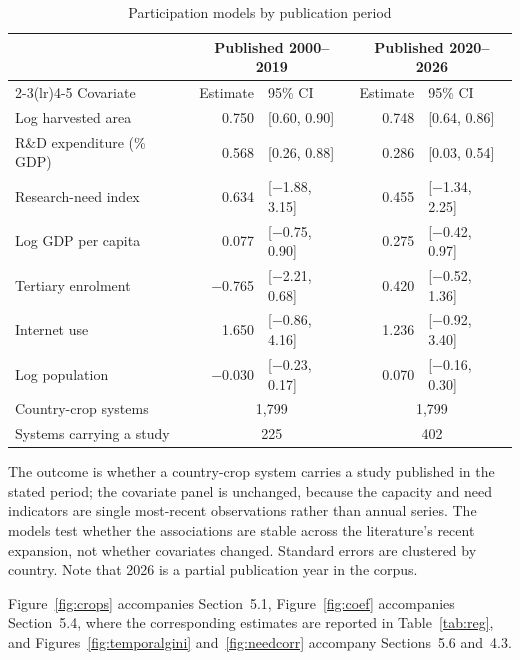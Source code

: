 \documentclass[ASNA,twocolumn]{USG}
\makeatletter
\newcommand{\applabel}[2]{\phantomsection\edef\@currentlabel{#1}\label{#2}}
\makeatother
\begin{document}
\begin{table}[t]
\centering
\footnotesize
\caption{Participation models by publication period}
\label{tab:periods}
\begin{tabular*}{\textwidth}{@{\extracolsep\fill}l r@{\hspace{6pt}}l r@{\hspace{6pt}}l@{}}
\toprule
& \multicolumn{2}{c}{Published 2000--2019} & \multicolumn{2}{c}{Published 2020--2026} \\
\cmidrule(lr){2-3}\cmidrule(lr){4-5}
Covariate & Estimate & 95\% CI & Estimate & 95\% CI \\
\midrule
Log harvested area & 0.750 & [0.60, 0.90] & 0.748 & [0.64, 0.86] \\
R\&D expenditure (\% GDP) & 0.568 & [0.26, 0.88] & 0.286 & [0.03, 0.54] \\
Research-need index & 0.634 & [$-$1.88, 3.15] & 0.455 & [$-$1.34, 2.25] \\
Log GDP per capita & 0.077 & [$-$0.75, 0.90] & 0.275 & [$-$0.42, 0.97] \\
Tertiary enrolment & $-$0.765 & [$-$2.21, 0.68] & 0.420 & [$-$0.52, 1.36] \\
Internet use & 1.650 & [$-$0.86, 4.16] & 1.236 & [$-$0.92, 3.40] \\
Log population & $-$0.030 & [$-$0.23, 0.17] & 0.070 & [$-$0.16, 0.30] \\
\midrule
Country-crop systems & \multicolumn{2}{c}{1,799} & \multicolumn{2}{c}{1,799} \\
Systems carrying a study & \multicolumn{2}{c}{225} & \multicolumn{2}{c}{402} \\
\bottomrule
\end{tabular*}
\begin{tablenotes}
\item[] The outcome is whether a country-crop system carries a study published in the stated period; the covariate panel is unchanged, because the capacity and need indicators are single most-recent observations rather than annual series. The models test whether the associations are stable across the literature's recent expansion, not whether covariates changed. Standard errors are clustered by country. Note that 2026 is a partial publication year in the corpus.
\end{tablenotes}
\end{table}

\applabel{Appendix E}{app:figs}

Figure~\ref{fig:crops} accompanies Section~5.1, Figure~\ref{fig:coef} accompanies
Section~5.4, where the corresponding estimates are reported in Table~\ref{tab:reg}, and
Figures~\ref{fig:temporalgini} and~\ref{fig:needcorr} accompany Sections~5.6 and~4.3.
\end{document}
